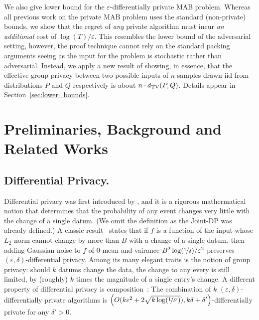 \documentclass{article}
\begin{document}
We also give lower bound for the $\varepsilon$-differentially private
MAB problem. Whereas all previous work on the private MAB problem uses
the standard (non-private) bounds, we show that the regret of
\emph{any} private algorithm must incur \emph{an additional} cost of
$\log(T)/\varepsilon$. This resembles the lower bound of the
adversarial setting, however, the proof technique cannot rely on the
standard packing arguments \citep[see, for
example,][]{HardtTalwarGeometryDP2010} seeing as the input for the
problem is stochastic rather than adversarial.  Instead, we apply a
new result of \citet{KarwaVadhanFiniteSampleDP2017} showing, in essence,
that the effective group-privacy between two possible inputs of $n$
samples drawn iid from distributions $P$ and $Q$ respectively is about
$n\cdot d_{\rm TV}(P,Q)$. Details appear in Section~\ref{sec:lower_bounds}.



\section{Preliminaries, Background and Related Works}
\label{sec:background}

\subsection{Differential Privacy.} Differential privacy was first introduced by
\citet{DworkCalibratingNoiseSensitivity2006, DworkKenthrapdai...2006}, and it is a rigorous mathermatical notion that determines that the probability of any event changes very little with the change of a single datum. (We omit the definition as the Joint-DP was already defined.) A classic result~\cite{DworkKenthrapdai...2006} states that if $f$ is a function of the input whose $L_2$-norm cannot change by more than $B$ with a change of a single datum, then adding Gaussian noise to $f$ of $0$-mean and vairance $B^2\log(\nicefrac 1 \delta)/\varepsilon^2$ preserves $(\varepsilon,\delta)$-differential privacy. Among its many elegant traits is the notion of group privacy: should $k$ datums change the data, the change to any every is still limited, by (roughly) $k$ times the magnitude of a single entry's change. A different property of differential privacy is composition~\cite{DworkRothblumVadhan2010}: The combination of $k$ $(\varepsilon,\delta)$-differentially private algorithms is $\left( O(k\varepsilon^2 + 2\sqrt{k\log(\nicefrac 1 {\delta'})}), k\delta+\delta'  \right)$-differentially private for any $\delta'>0$.
\end{document}
